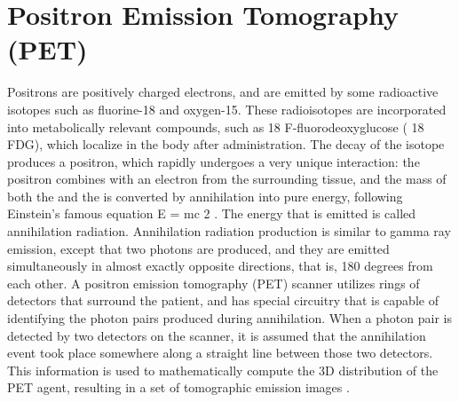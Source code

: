 \chapter{Positron Emission Tomography (PET)}

Positrons are positively charged electrons, and are emitted by some radioactive
isotopes such as fluorine-18 and oxygen-15. These radioisotopes are incorporated
into metabolically relevant compounds, such as 18 F-fluorodeoxyglucose ( 18 FDG),
which localize in the body after administration. The decay of the isotope produces
a positron, which rapidly undergoes a very unique interaction: the positron 
combines with an electron from the surrounding tissue, and the mass of both
the  and the  is converted by annihilation into pure energy, following Einstein’s
famous equation E = mc 2 . The energy that is emitted is called annihilation radiation.
Annihilation radiation production is similar to gamma ray emission, except that
two photons are produced, and they are emitted simultaneously in almost exactly
opposite directions, that is, 180 degrees from each other. A positron emission
tomography (PET) scanner utilizes rings of detectors that surround the patient, and
has special circuitry that is capable of identifying the photon pairs produced during
annihilation. When a photon pair is detected by two detectors on the scanner, it
is assumed that the annihilation event took place somewhere along a straight line
between those two detectors. This information is used to mathematically compute
the 3D distribution of the PET agent, resulting in a set of tomographic emission
images \cite{bushberg2011essential}. 
